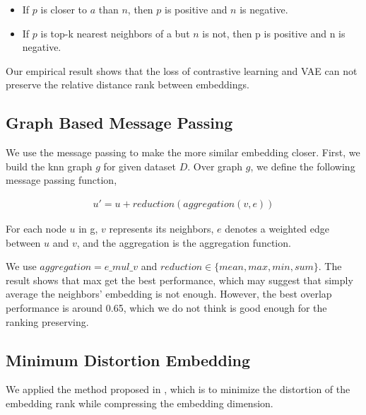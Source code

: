 \documentclass{ol-softwaremanual}
\begin{document}
\begin{itemize}
    \item If $p$ is closer to $a$ than $n$, then $p$ is positive and $n$ is negative.
    \item If $p$ is top-k nearest neighbors of a but $n$ is not, then p is positive and n is negative.
\end{itemize}

Our empirical result shows that the loss of contrastive learning and VAE can not preserve the relative distance rank between embeddings. 

\subsection{Graph Based Message Passing}
We use the message passing to make the more similar embedding closer. First, we build the knn graph $g$ for given dataset $D$. Over graph $g$, we define the following message passing function, 

\begin{align}
    u' = u + reduction(aggregation(v, e))
\end{align}

For each node $u$ in g, $v$ represents its neighbors, $e$ denotes a weighted edge between $u$ and $v$, and the aggregation is the aggregation function.

We use $aggregation=e\_mul\_v$ and $reduction\in\{mean,max,min,sum\}$. The result shows that max get the best performance, which may suggest that simply average the neighbors' embedding is not enough. However, the best overlap performance is around 0.65, which we do not think is good enough for the ranking preserving.

\subsection{Minimum Distortion Embedding}
We applied the method proposed in \cite{agrawal__MinimumDistortionEmbedding}, which is to minimize the distortion of the embedding rank while compressing the embedding dimension. 




% 




\end{document}
